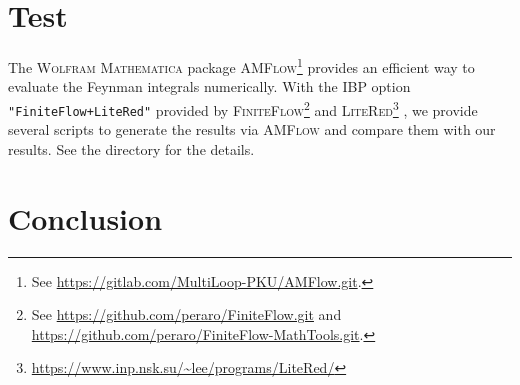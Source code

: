 \documentclass{article}
\begin{document}

    \section{Test}\label{sec:test}

        The \textsc{Wolfram Mathematica} package \textsc{AMFlow}\footnote{See \url{https://gitlab.com/MultiLoop-PKU/AMFlow.git}.} \cite{Liu:2022chg} provides an efficient way to evaluate the Feynman integrals numerically.
        With the IBP option \texttt{"FiniteFlow+LiteRed"} provided by \textsc{FiniteFlow}\footnote{See \url{https://github.com/peraro/FiniteFlow.git} and \url{https://github.com/peraro/FiniteFlow-MathTools.git}.} \cite{Peraro:2019svx} and \textsc{LiteRed}\footnote{\url{https://www.inp.nsk.su/~lee/programs/LiteRed/}} \cite{Lee:2012cn, Lee:2013mka}, we provide several scripts to generate the results via \textsc{AMFlow} and compare them with our results.
        See the directory  for the details.

    \section{Conclusion}\label{sec:conclusion}

    \clearpage
    \printbibliography[heading=bibintoc]
\end{document}

